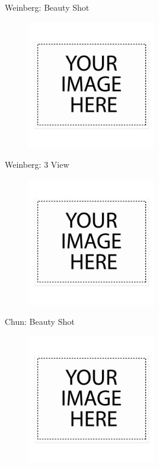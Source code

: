 \documentclass[10pt]{beamer}
\begin{document}
	\begin{frame}{Weinberg: Beauty Shot}
\begin{figure}
	\centering
	\includegraphics[width=0.5\textwidth]{Weinberg_Beauty.png}
\end{figure}
\end{frame}

\begin{frame}{Weinberg: 3 View}
\begin{figure}
\centering
\includegraphics[width=0.5\textwidth]{Weinberg_3_View.png}
\end{figure}
\end{frame}

	\begin{frame}{Chun: Beauty Shot}
\begin{figure}
	\centering
	\includegraphics[width=0.5\textwidth]{Chun_Beauty.png}
\end{figure}
\end{frame}
\end{document}
